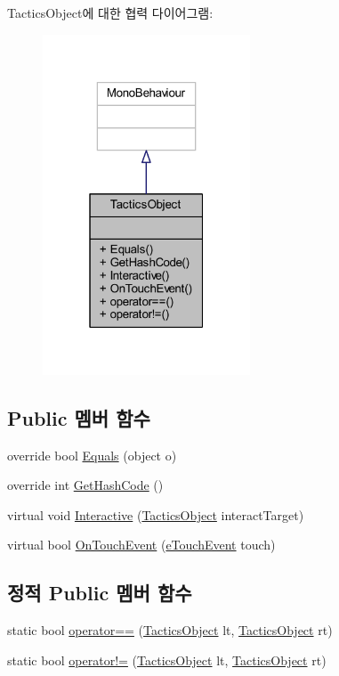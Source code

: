 Tactics\+Object에 대한 협력 다이어그램\+:\nopagebreak
\begin{figure}[H]
\begin{center}
\leavevmode
\includegraphics[width=175pt]{class_tactics_object__coll__graph}
\end{center}
\end{figure}
\subsection*{Public 멤버 함수}
\begin{DoxyCompactItemize}
\item 
override bool \hyperlink{class_tactics_object_aa445b127fafc61d84a064b423a155c1a}{Equals} (object o)
\item 
override int \hyperlink{class_tactics_object_a5fe0e8c99cec56daa7909754f037ac26}{Get\+Hash\+Code} ()
\item 
virtual void \hyperlink{class_tactics_object_a5f94ed01497a7072a2785163f4cbc57b}{Interactive} (\hyperlink{class_tactics_object}{Tactics\+Object} interact\+Target)
\item 
virtual bool \hyperlink{class_tactics_object_af34052e62ea471d21e4c601cc79ff717}{On\+Touch\+Event} (\hyperlink{_touch_manager_8cs_ae33e321a424fe84ba8b2fdb81ad40a68}{e\+Touch\+Event} touch)
\end{DoxyCompactItemize}
\subsection*{정적 Public 멤버 함수}
\begin{DoxyCompactItemize}
\item 
static bool \hyperlink{class_tactics_object_a18f2979a4bf81dc755fbc17e425809f0}{operator==} (\hyperlink{class_tactics_object}{Tactics\+Object} lt, \hyperlink{class_tactics_object}{Tactics\+Object} rt)
\item 
static bool \hyperlink{class_tactics_object_a49e235618a22126faa6271243cd89710}{operator!=} (\hyperlink{class_tactics_object}{Tactics\+Object} lt, \hyperlink{class_tactics_object}{Tactics\+Object} rt)
\end{DoxyCompactItemize}


